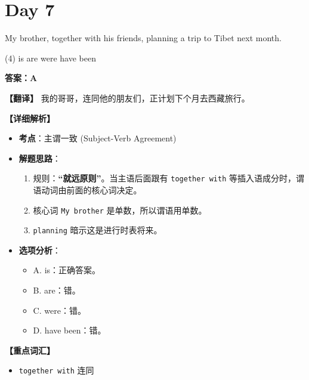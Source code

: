 \documentclass[11pt, a4paper]{article}
\newcommand{\analysis}[4]{
    \begin{solutionbox}
        \textbf{答案：#1}
        
        \textbf{【翻译】} #2
        
        \textbf{【详细解析】}
        #3
        
        \textbf{【重点词汇】}
        #4
    \end{solutionbox}
}
\newcommand{\blank}{\underline{\hspace{1.5cm}}}
\begin{document}
\section*{Day 7}
\begin{questions}
    \item My brother, together with his friends, \blank planning a trip to Tibet next month.
    \begin{tasks}(4)
        \task is \task are \task were \task have been
    \end{tasks}
    \analysis{A}{我的哥哥，连同他的朋友们，正计划下个月去西藏旅行。}{
        \begin{itemize}
            \item \textbf{考点}：主谓一致 (Subject-Verb Agreement)
            \item \textbf{解题思路}：
                \begin{enumerate}
                    \item 规则：\textbf{“就远原则”}。当主语后面跟有 \texttt{together with} 等插入语成分时，谓语动词由前面的核心词决定。
                    \item 核心词 \texttt{My brother} 是单数，所以谓语用单数。
                    \item \texttt{planning} 暗示这是进行时表将来。
                \end{enumerate}
            \item \textbf{选项分析}：
                \begin{itemize}
                    \item A. is：正确答案。
                    \item B. are：错。
                    \item C. were：错。
                    \item D. have been：错。
                \end{itemize}
        \end{itemize}
    }{
        \begin{itemize}
            \item \texttt{together with} 连同
        \end{itemize}
    }


\end{questions}
\end{document}
